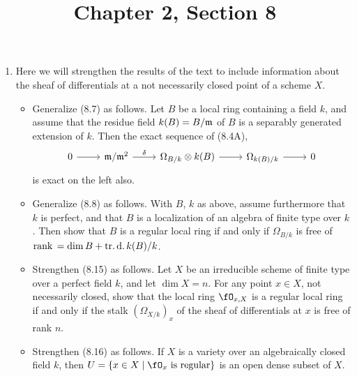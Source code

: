 \documentclass[a4paper]{article}
\title{Chapter 2, Section 8}
\begin{document}
\maketitle

\begin{enumerate} [label=\textbf{\arabic*.}, leftmargin=0em]

    \item[\textbf{1.}] Here we will strengthen the results of the text to include information about the sheaf of differentials at a not necessarily closed point of a scheme $X$.
          \begin{itemize}
              \item[(a)] Generalize (8.7) as follows.
                    Let $B$ be a local ring containing a field $k$, and assume that the residue field $k(B) = B / \mathfrak{m}$ of $B$ is a separably generated extension of $k$.
                    Then the exact sequence of (8.4A),
                    \[ \begin{tikzcd}
                            0 \arrow[r] & \goth{m}/\goth{m}^2 \arrow[r, "\delta"] & \Omega_{B/k} \otimes k(B) \arrow[r] & \Omega_{k(B)/k} \arrow[r] & 0
                        \end{tikzcd} \]
                    is exact on the left also.

              \item[(b)] Generalize (8.8) as follows. With $B$, $k$ as above, assume furthermore that $k$ is perfect, and that $B$ is a localization of an algebra of finite type over $k$.
                    Then show that $B$ is a regular local ring if and only if $\Omega_{B/k}$ is free of $\operatorname{rank}{} = \dim{B} + \operatorname{tr.d.} k(B) / k$.

              \item[(c)] Strengthen (8.15) as follows.
                    Let $X$ be an irreducible scheme of finite type over a perfect field $k$, and let $\dim{X} = n$.
                    For any point $x \in X$, not necessarily closed, show that the local ring $\fO_{x, X}$ is a regular local ring if and only if the stalk $(\Omega_{X/k})_x$ of the sheaf of differentials at $x$ is free of rank $n$.

              \item[(d)] Strengthen (8.16) as follows. If $X$ is a variety over an algebraically closed field $k$, then $U = \{x \in X \mid \fO_x \text{ is regular} \}$ is an open dense subset of $X$.
          \end{itemize}


\end{enumerate}
\end{document}
